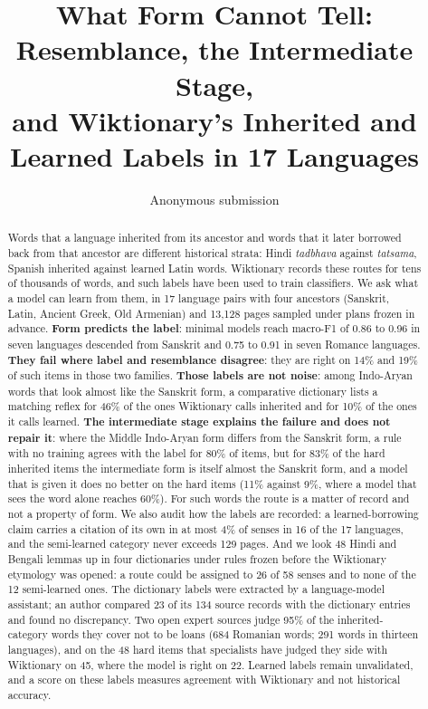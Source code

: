 \documentclass[11pt]{article}
\title{What Form Cannot Tell: Resemblance, the Intermediate Stage,\\and Wiktionary's Inherited and Learned Labels in 17 Languages}
\author{Anonymous submission}
\begin{document}
\maketitle

\begin{abstract}
Words that a language inherited from its ancestor and words that it later borrowed back from that ancestor are different historical strata: Hindi \textit{tadbhava} against \textit{tatsama}, Spanish inherited against learned Latin words. Wiktionary records these routes for tens of thousands of words, and such labels have been used to train classifiers. We ask what a model can learn from them, in 17 language pairs with four ancestors (Sanskrit, Latin, Ancient Greek, Old Armenian) and 13,128 pages sampled under plans frozen in advance. \textbf{Form predicts the label}: minimal models reach macro-F1 of 0.86 to 0.96 in seven languages descended from Sanskrit and 0.75 to 0.91 in seven Romance languages. \textbf{They fail where label and resemblance disagree}: they are right on 14\% and 19\% of such items in those two families. \textbf{Those labels are not noise}: among Indo-Aryan words that look almost like the Sanskrit form, a comparative dictionary lists a matching reflex for 46\% of the ones Wiktionary calls inherited and for 10\% of the ones it calls learned. \textbf{The intermediate stage explains the failure and does not repair it}: where the Middle Indo-Aryan form differs from the Sanskrit form, a rule with no training agrees with the label for 80\% of items, but for 83\% of the hard inherited items the intermediate form is itself almost the Sanskrit form, and a model that is given it does no better on the hard items (11\% against 9\%, where a model that sees the word alone reaches 60\%). For such words the route is a matter of record and not a property of form. We also audit how the labels are recorded: a learned-borrowing claim carries a citation of its own in at most 4\% of senses in 16 of the 17 languages, and the semi-learned category never exceeds 129 pages. And we look 48 Hindi and Bengali lemmas up in four dictionaries under rules frozen before the Wiktionary etymology was opened: a route could be assigned to 26 of 58 senses and to none of the 12 semi-learned ones. The dictionary labels were extracted by a language-model assistant; an author compared 23 of its 134 source records with the dictionary entries and found no discrepancy. Two open expert sources judge 95\% of the inherited-category words they cover not to be loans (684 Romanian words; 291 words in thirteen languages), and on the 48 hard items that specialists have judged they side with Wiktionary on 45, where the model is right on 22. Learned labels remain unvalidated, and a score on these labels measures agreement with Wiktionary and not historical accuracy.
\end{abstract}
\end{document}
